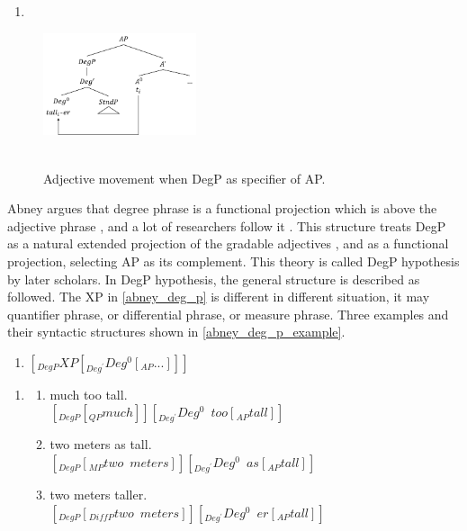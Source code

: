\documentclass{ctexart}
\let \cite \parencite
\begin{document}
\begin{enumerate}
    \item \label{traditional_move}
\end{enumerate}

\begin{figure}[H]
    \centering
    \includegraphics[width=0.4\textwidth]{pic/traditional_move.png}
    \begin{caption}
        \\ \vspace{-1.1ex}
        Adjective movement when DegP as specifier of AP.
    \end{caption}
\end{figure}

Abney argues that degree phrase is a functional projection which is above the adjective phrase \cite{abney1987}, and a lot of researchers follow it \cite{corver1993,zwarts1992}. This structure treats DegP as a natural extended projection of the gradable adjectives \cite{grimshaw2005}, and as a functional projection, selecting AP as its complement. This theory is called DegP hypothesis by later scholars. In DegP hypothesis, the general structure is described as followed. The XP in \ref{abney_deg_p} is different in different situation, it may quantifier phrase, or differential phrase, or measure phrase. Three examples and their syntactic structures shown in \ref{abney_deg_p_example}.

\begin{enumerate}
    \item \label{abney_deg_p} $[_{DegP} XP [_{Deg^{\prime}}Deg^0[_{AP}...]]] $
\end{enumerate}

\begin{enumerate}
    \item \label{abney_deg_p_example}
    \begin{enumerate}
        \item \label{abney_deg_p_example_1}
        much too tall.\\
        $[_{DegP} [_{QP} much]] [_{Deg^{\prime}}Deg^0 \enspace too [_{AP}tall]] $
        \item \label{abney_deg_p_example_2}
        two meters as tall.\\
        $[_{DegP} [_{MP} two \enspace meters]] [_{Deg^{\prime}}Deg^0 \enspace as [_{AP}tall]] $
        \item \label{abney_deg_p_example_3}
        two meters taller.\\
        $[_{DegP} [_{DiffP} two \enspace meters]] [_{Deg^{\prime}}Deg^0 \enspace er [_{AP}tall]] $

    \end{enumerate}
\end{enumerate}
\end{document}
